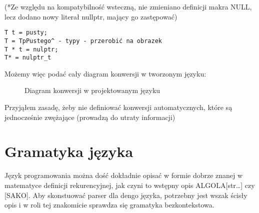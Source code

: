 (*Ze względu na kompatybilność wsteczną, nie zmieniano definicji makra NULL, lecz dodano nowy literał nullptr, mający go zastępować)
\begin{lstlisting}
T t = pusty;
T = TpPustego^ - typy - przerobić na obrazek
T * t = nulptr;
T* = nulptr_t
\end{lstlisting}
Możemy więc podać cały diagram konwersji w tworzonym języku:


\begin{figure}[h]
    \centering
    
    \caption{Diagram konwersji w projektowanym języku}
\end{figure}

Przyjąłem zasadę, żeby nie definiować konwersji automatycznych, które są jednocześnie zwężające (prowadzą do utraty informacji)

\section{Gramatyka języka}
Język programowania można dość dokładnie opisać w formie dobrze znanej w matematyce definicji rekurencyjnej, jak czyni to wstępny opis ALGOLA[str…] czy [SAKO]. Aby skonstuować parser dla dengo języka, potrzebny jest wszak ścisły opis i w roli tej znakomicie sprawdza się gramatyka bezkontekstowa.

